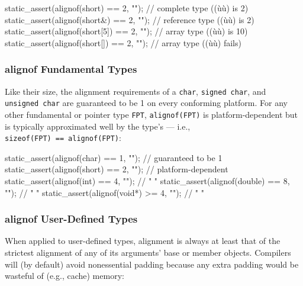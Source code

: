 \begin{emcppslisting}
static_assert(alignof(short)    == 2, "");  // complete type   ((ù{}ù) is 2)
static_assert(alignof(short&)   == 2, "");  // reference type  ((ù{}ù) is 2)
static_assert(alignof(short[5]) == 2, "");  // array type      ((ù{}ù) is 10)
static_assert(alignof(short[])  == 2, "");  // array type      ((ù{}ù) fails)
\end{emcppslisting}


\subsubsection[\lstinline!alignof! Fundamental Types]{{\SubsubsecCode alignof} Fundamental Types}\label{alignof-fundamental-types}

Like their size, the alignment requirements of a \lstinline!char!,
\lstinline!signed!~\lstinline!char!, and \lstinline!unsigned!~\lstinline!char! are
guaranteed to be 1 on every conforming
platform. For any other fundamental or pointer type \lstinline!FPT!,
\lstinline!alignof(FPT)! is platform-dependent but is typically approximated well by the type's  --- i.e.,
\lstinline!sizeof(FPT)!~\lstinline!==!~\lstinline!alignof(FPT)!:

\begin{emcppslisting}
static_assert(alignof(char)   == 1, "");  // guaranteed to be 1
static_assert(alignof(short)  == 2, "");  // platform-dependent
static_assert(alignof(int)    == 4, "");  //    "         "
static_assert(alignof(double) == 8, "");  //    "         "
static_assert(alignof(void*)  >= 4, "");  //    "         "
\end{emcppslisting}


\subsubsection[\lstinline!alignof! User-Defined Types]{{\SubsubsecCode alignof} User-Defined Types}\label{alignof-user-defined-types}

When applied to user-defined types, alignment is always at least that of
the strictest alignment of any of its arguments' base or member objects.
%
Compilers will (by default) avoid nonessential padding because any
extra padding would be wasteful of (e.g., cache)
memory:

